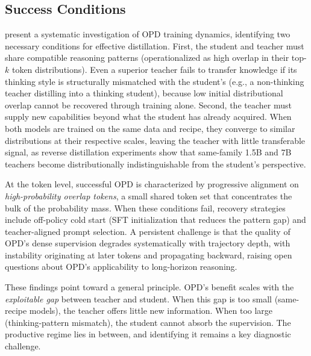 \documentclass{article} %
\begin{document}
\subsection{Success Conditions}
\label{subsec:success}

\citet{2604.13016} present a systematic investigation of OPD training dynamics, identifying two necessary conditions for effective distillation. First, the student and teacher must share compatible reasoning patterns (operationalized as high overlap in their top-$k$ token distributions). Even a superior teacher fails to transfer knowledge if its thinking style is structurally mismatched with the student's (e.g., a non-thinking teacher distilling into a thinking student), because low initial distributional overlap cannot be recovered through training alone. Second, the teacher must supply new capabilities beyond what the student has already acquired. When both models are trained on the same data and recipe, they converge to similar distributions at their respective scales, leaving the teacher with little transferable signal, as reverse distillation experiments show that same-family 1.5B and 7B teachers become distributionally indistinguishable from the student's perspective.

At the token level, successful OPD is characterized by progressive alignment on \emph{high-probability overlap tokens}, a small shared token set that concentrates the bulk of the probability mass. When these conditions fail, recovery strategies include off-policy cold start (SFT initialization that reduces the pattern gap) and teacher-aligned prompt selection. A persistent challenge is that the quality of OPD's dense supervision degrades systematically with trajectory depth, with instability originating at later tokens and propagating backward, raising open questions about OPD's applicability to long-horizon reasoning.

These findings point toward a general principle. OPD's benefit scales with the \emph{exploitable gap} between teacher and student. When this gap is too small (same-recipe models), the teacher offers little new information. When too large (thinking-pattern mismatch), the student cannot absorb the supervision. The productive regime lies in between, and identifying it remains a key diagnostic challenge.
\end{document}
